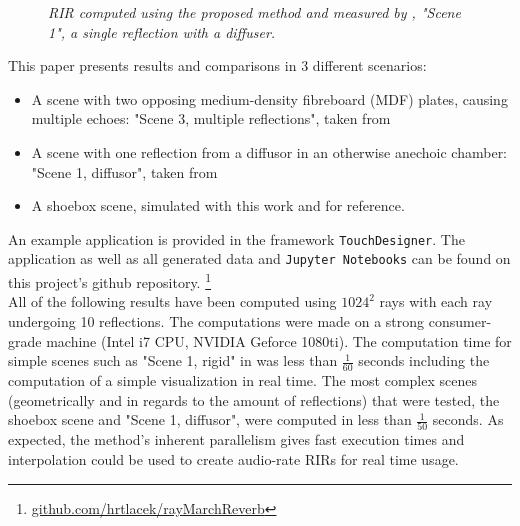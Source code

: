 \documentclass[twoside,a4paper]{article}
\begin{document}
\begin{figure}
    \begin{center}
      
    \end{center}
    
    \caption{\label{fig:diffuser} \it RIR computed using the proposed method and measured by \cite{brinkmann_round_2019}, "Scene 1", a single reflection with a diffuser.}
\end{figure}



This paper presents results and comparisons in 3 different scenarios:
\begin{itemize}
\item A scene with two opposing medium-density fibreboard (MDF) plates, causing multiple echoes: "Scene 3, multiple reflections", taken from \cite{brinkmann_round_2019}
\item A scene with one reflection from a diffusor in an otherwise anechoic chamber: "Scene 1, diffusor", taken from \cite{brinkmann_round_2019}
\item A shoebox scene, simulated with this work and \cite{lehmann_fast_2020} for reference.
\end{itemize}
An example application is provided in the framework \texttt{TouchDesigner}. The application as well as all generated data and \texttt{Jupyter Notebooks} can be found on this project's github repository. \footnote{ \href{https://github.com/hrtlacek/rayMarchReverb}{github.com/hrtlacek/rayMarchReverb}} \\
All of the following results have been computed using $1024^2$ rays with each ray undergoing 10 reflections. The computations were made on a strong consumer-grade machine (Intel i7 CPU, NVIDIA Geforce 1080ti). The computation time for simple scenes such as "Scene 1, rigid" in \cite{brinkmann_round_2019} was less than $\frac{1}{60}$ seconds including the computation of a simple visualization in real time. The most complex scenes (geometrically and in regards to the amount of reflections) that were tested, the shoebox scene and "Scene 1, diffusor", were computed in less than $\frac{1}{50}$ seconds. As expected, the method's inherent parallelism gives fast execution times and interpolation could be used to create audio-rate RIRs for real time usage. \

\end{document}

